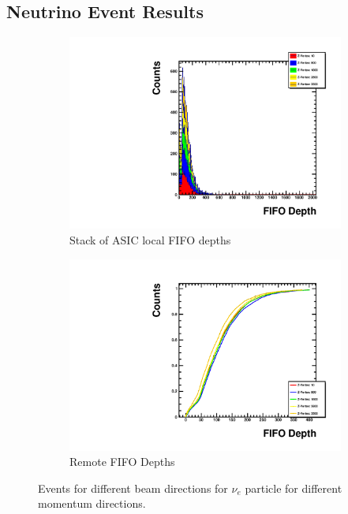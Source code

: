 \subsection{Neutrino Event Results}




 
\begin{figure}
\centering
\begin{subfigure}{.5\textwidth}
  \centering
  \includegraphics[width=\textwidth]{images/Const_Theta0_ASIC_stack_integral_pdg12_fhc.pdf}
  \caption{Stack of ASIC local FIFO depths}
\end{subfigure}%
\begin{subfigure}{.5\textwidth}
  \centering
  \includegraphics[width=\textwidth]{images/Const_Theta0_ASIC_integral_pdg12_fhc.pdf}
  \caption{Remote FIFO Depths}
\end{subfigure}
\caption{Events for different beam directions for $\nu_{e}$ particle for different momentum directions.}
\label{fig:example_asic_integral_value_constTheta}
\end{figure}


